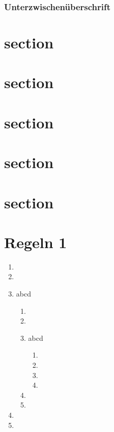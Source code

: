 \documentclass[ngerman]{scrartcl}
\begin{document}
	\lipsum[1-1]

	\subsubsection*{Unterzwischenüberschrift}

	\lipsum[1-1]



	\section{section}
	\lipsum[1-5]

	\section{section}
	\lipsum[1-5]

	\section{section}
	\lipsum[1-5]

	\section{section}
	\lipsum[1-5]

	\section{section}
	\lipsum[1-25]

	\section{Regeln 1}

	\begin{enumerate}
		\item \lipsum[1]
		\item \lipsum[1]
		\item abcd
			\begin{enumerate}
				\item \lipsum[1]
				\item \lipsum[1]
				\item abcd
					\begin{enumerate}
						\item \lipsum[1]
						\item \lipsum[1]
						\item \lipsum[1]
						\item \lipsum[1]
					\end{enumerate}
				\item \lipsum[1]
				\item \lipsum[1]
			\end{enumerate}
		\item \lipsum[1]
		\item \lipsum[1]
	\end{enumerate}
\end{document}
